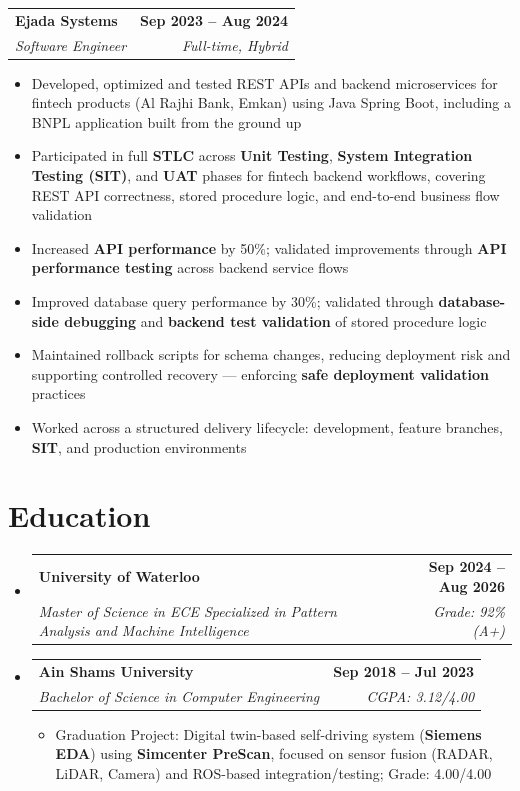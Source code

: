 \documentclass[letterpaper,11pt]{article}
\makeatletter
\newcommand{\resumeItem}[1]{
  \item\small{
    {#1 \vspace{-2pt}}
  }
}
\newcommand{\resumeSubheading}[4]{
  \vspace{-2pt}\item
    \begin{tabular*}{1.0\textwidth}[t]{l@{\extracolsep{\fill}}r}
      \textbf{#1} & \textbf{\small #2} \\
      \textit{\small#3} & \textit{\small #4} \\
    \end{tabular*}\vspace{-7pt}
}
\newcommand{\resumeSubHeadingListStart}{\begin{itemize}[leftmargin=0.0in, label={}]}
\newcommand{\resumeSubHeadingListEnd}{\end{itemize}}
\newcommand{\resumeItemListStart}{\begin{itemize}}
\newcommand{\resumeItemListEnd}{\end{itemize}\vspace{-5pt}}
\makeatother
\begin{document}
\resumeSubheading
  {Ejada Systems}{Sep 2023 -- Aug 2024}
  {Software Engineer}{Full-time, Hybrid}
\resumeItemListStart
    \resumeItem{Developed, optimized and tested REST APIs and backend microservices for fintech products (Al Rajhi Bank, Emkan) using Java Spring Boot, including a BNPL application built from the ground up}
    \resumeItem{Participated in full \textbf{STLC} across \textbf{Unit Testing}, \textbf{System Integration Testing (SIT)}, and \textbf{UAT} phases for fintech backend workflows, covering REST API correctness, stored procedure logic, and end-to-end business flow validation}
    \resumeItem{Increased \textbf{API performance} by 50\%; validated improvements through \textbf{API performance testing} across backend service flows}
    \resumeItem{Improved database query performance by 30\%; validated through \textbf{database-side debugging} and \textbf{backend test validation} of stored procedure logic}
    \resumeItem{Maintained rollback scripts for schema changes, reducing deployment risk and supporting controlled recovery --- enforcing \textbf{safe deployment validation} practices}
    \resumeItem{Worked across a structured delivery lifecycle: development, feature branches, \textbf{SIT}, and production environments}
  \resumeItemListEnd


\section{Education}
  \resumeSubHeadingListStart

    \resumeSubheading
      {University of Waterloo}{Sep 2024 -- Aug 2026}
      {Master of Science in ECE Specialized in Pattern Analysis and Machine Intelligence}{Grade: 92\% (A+)}

\resumeSubheading
  {Ain Shams University}{Sep 2018 -- Jul 2023}
  {Bachelor of Science in Computer Engineering}{CGPA: 3.12/4.00}
  \resumeItemListStart
    \resumeItem{Graduation Project: Digital twin-based self-driving system (\textbf{Siemens EDA}) using \textbf{Simcenter PreScan}, focused on sensor fusion (RADAR, LiDAR, Camera) and ROS-based integration/testing; Grade: 4.00/4.00}
  \resumeItemListEnd

  \resumeSubHeadingListEnd
\end{document}

